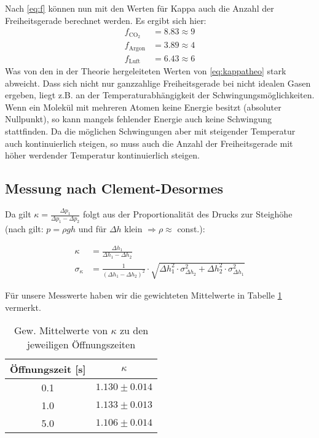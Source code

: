 \documentclass[12pt,a4paper,titlepage,headinclude,bibtotoc]{scrartcl}
\begin{document}
Nach \eqref{eq:f} %
können nun mit den Werten für Kappa auch die Anzahl der Freiheitsgerade berechnet werden. Es ergibt sich hier:
\begin{align*}
	f_{\text{CO}_2}&= 8.83\approx 9\\
	f_\text{Argon} &= 3.89\approx 4 \\
	f_\text{Luft}  &=6.43\approx 6
\end{align*}
Was von den in der Theorie hergeleiteten Werten von \eqref{eq:kappatheo} %
stark abweicht.
Dass sich nicht nur ganzzahlige Freiheitsgerade bei nicht idealen Gasen ergeben, liegt z.B. an der Temperaturabhängigkeit der Schwingungsmöglichkeiten.
Wenn ein Molekül mit mehreren Atomen keine Energie besitzt (absoluter Nullpunkt), so kann mangels fehlender Energie auch keine Schwingung stattfinden.
Da die möglichen Schwingungen aber mit steigender Temperatur auch kontinuierlich steigen, so muss auch die Anzahl der Freiheitsgerade mit höher werdender Temperatur kontinuierlich steigen.

\subsection{Messung nach Clement-Desormes}

Da gilt $\kappa=\frac{\Delta p_1}{\Delta p_1-\Delta p_2}$ folgt aus der Proportionalität des Drucks zur Steighöhe (nach \cite[S. 457]{giancoli} gilt: $p=\rho g h$ und für $\Delta h$ klein $\Rightarrow \rho\approx$ const.):

\begin{align*}
	\kappa&=\frac{\Delta h_{1}}{\Delta h_{1} - \Delta h_{2}}\\
	\sigma_{\kappa}&=\frac{1}{\left(\Delta h_{1} - \Delta h_{2}\right)^{2}} \cdot \sqrt{\Delta h_{1}^{2} \cdot \sigma_{\Delta h_2}^{2} + \Delta h_{2}^{2} \cdot \sigma_{\Delta h_1}^{2}}
\end{align*}

Für unsere Messwerte haben wir die gewichteten Mittelwerte in Tabelle \ref{tab:kappaclement} vermerkt.

\begin{table}[!htb]
	\centering
	\begin{tabular}{|c|c|}
		\hline
		Öffnungszeit [s] & $\kappa$\\\hline
		0.1 & $1.130 \pm 0.014$\\
		1.0 & $1.133 \pm 0.013$\\
		5.0 & $1.106 \pm 0.014$\\
		\hline
	\end{tabular}
	\caption{Gew. Mittelwerte von $\kappa$ zu den jeweiligen Öffnungszeiten}
	\label{tab:kappaclement}
\end{table}
\end{document}
